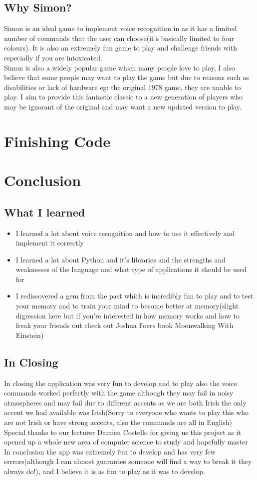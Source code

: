 \documentclass{article}
\begin{document}
\subsection{Why Simon?}
Simon is an ideal game to implement voice recognition in as it has a limited number of commands that the user can choose(it's basically limited to four colours).  It is also an extremely fun game to play and challenge friends with especially if you are intoxicated.
\\
Simon is also a widely popular game which many people love to play,  I also believe that some people may want to play the game but due to reasons such as disabilities or lack of hardware eg: the original 1978 game, they are unable to play.  I aim to provide this fantastic classic to a new generation of players who may be ignorant of the original and may want a new updated version to play.
\section{Finishing Code}
\section {Conclusion}
\subsection{What I learned}
\begin{itemize}
\item I learned a lot about voice recognition and how to use it effectively and implement it correctly
\item I learned a lot about Python and it's libraries and the strengths and weaknesses of the language and what type of applications it should be used for
\item I rediscovered a gem from the past which is incredibly fun to play and to test your memory and to train your mind to become better at memory(slight digression here but if you're interested in how memory works and how to freak your friends out check out Joshua Foers book Moonwalking With Einstein\cite{MoonwalkWithEinstein})
\end{itemize}
\subsection{In Closing}
In closing the application was very fun to develop and to play also the voice commands worked perfectly with the game although they may fail in noisy atmospheres and may fail due to different accents as we are both Irish the only accent we had available was Irish(Sorry to everyone who wants to play this who are not Irish or have strong accents, also the commands are all in English)
\\
Special thanks to our lecturer Damien Costello for giving us this project as it opened up a whole new area of computer science to study and hopefully master
\\
In conclusion the app was extremely fun to develop and has very few errrors(although I can almost guarantee someone will find a way to break it they always do!), and I believe it is as fun to play as it was to develop.


\end{document}
